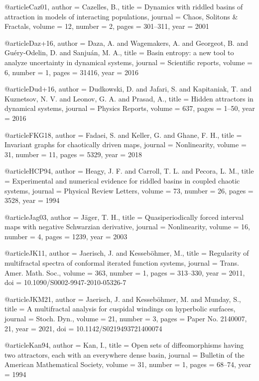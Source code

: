 @article{Caz01,
  author = {Cazelles, B.},
  title = {Dynamics with riddled basins of attraction in models of interacting populations},
  journal = {Chaos, Solitons \& Fractals},
  volume = {12},
  number = {2},
  pages = {301--311},
  year = {2001}
}

@article{Daz+16,
  author = {Daza, A. and Wagemakers, A. and Georgeot, B. and Gu{\'e}ry-Odelin, D. and Sanju{\'a}n, M. A.},
  title = {Basin entropy: a new tool to analyze uncertainty in dynamical systems},
  journal = {Scientific reports},
  volume = {6},
  number = {1},
  pages = {31416},
  year = {2016}
}

@article{Dud+16,
  author = {Dudkowski, D. and Jafari, S. and Kapitaniak, T. and Kuznetsov, N. V. and Leonov, G. A. and Prasad, A.},
  title = {Hidden attractors in dynamical systems},
  journal = {Physics Reports},
  volume = {637},
  pages = {1--50},
  year = {2016}
}

@article{FKG18,
  author = {Fadaei, S. and Keller, G. and Ghane, F. H.},
  title = {Invariant graphs for chaotically driven maps},
  journal = {Nonlinearity},
  volume = {31},
  number = {11},
  pages = {5329},
  year = {2018}
}

@article{HCP94,
  author = {Heagy, J. F. and Carroll, T. L. and Pecora, L. M.},
  title = {Experimental and numerical evidence for riddled basins in coupled chaotic systems},
  journal = {Physical Review Letters},
  volume = {73},
  number = {26},
  pages = {3528},
  year = {1994}
}

@article{Jag03,
  author = {J{\"a}ger, T. H.},
  title = {Quasiperiodically forced interval maps with negative Schwarzian derivative},
  journal = {Nonlinearity},
  volume = {16},
  number = {4},
  pages = {1239},
  year = {2003}
}

@article{JK11,
  author = {Jaerisch, J. and Kesseb{\"o}hmer, M.},
  title = {Regularity of multifractal spectra of conformal iterated function systems},
  journal = {Trans. Amer. Math. Soc.},
  volume = {363},
  number = {1},
  pages = {313--330},
  year = {2011},
  doi = {10.1090/S0002-9947-2010-05326-7}
}

@article{JKM21,
  author = {Jaerisch, J. and Kesseb{\"o}hmer, M. and Munday, S.},
  title = {A multifractal analysis for cuspidal windings on hyperbolic surfaces},
  journal = {Stoch. Dyn.},
  volume = {21},
  number = {3},
  pages = {Paper No. 2140007, 21},
  year = {2021},
  doi = {10.1142/S0219493721400074}
}

@article{Kan94,
  author = {Kan, I.},
  title = {Open sets of diffeomorphisms having two attractors, each with an everywhere dense basin},
  journal = {Bulletin of the American Mathematical Society},
  volume = {31},
  number = {1},
  pages = {68--74},
  year = {1994}
}

